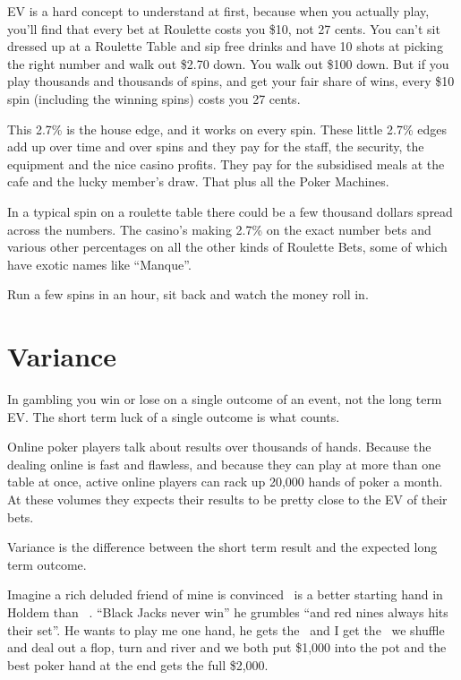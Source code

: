EV is a hard concept to understand at first, because when you actually
play, you'll find that every bet at Roulette costs you \$10, not
27 cents. You can't sit dressed up at a Roulette Table and sip free
drinks and have 10 shots at picking the right number and walk out \$2.70
down. You walk out \$100 down. But if you play thousands and thousands
of spins, and get your fair share of wins, every \$10 spin (including
the winning spins) costs you 27 cents.

This 2.7\% is the house edge, and it works on every spin. These little 2.7\%
edges add up over time and over spins and they pay for the staff, the
security, the equipment and the nice casino profits. They pay for the
subsidised meals at the cafe and the lucky member's draw. That plus
all the Poker Machines.

In a typical spin on a roulette table there could be a few thousand dollars
spread across the numbers. The casino's making 2.7\% on the exact number
bets and various other percentages on all the other kinds of Roulette Bets,
some of which have exotic names like ``Manque''.

Run a few spins in an hour, sit back and watch the money roll in.

\section{Variance}

In gambling you win or lose on a single outcome of an event,
not the long term EV. The short term luck of a single outcome
is what counts.

Online poker players talk about results over thousands of hands. Because the
dealing online is fast and flawless, and because they can play at
more than one table at once, active online players can rack up
20,000 hands of poker a month. At these volumes they expects their
results to be pretty close to the EV of their bets.

Variance is the difference between the short term result and the
expected long term outcome.

Imagine a rich deluded friend of mine is convinced \nineh\nined\ is a better
starting hand in Holdem than \Jc\Js\ . ``Black Jacks never win'' he grumbles
``and red nines always hits their set''. He wants to play me one hand, he
gets the \nineh\nined\ and I get the \Jc\Js\, we shuffle and deal out a flop,
turn and river and we both put \$1,000 into the pot and the best
poker hand at the end gets the full \$2,000.

